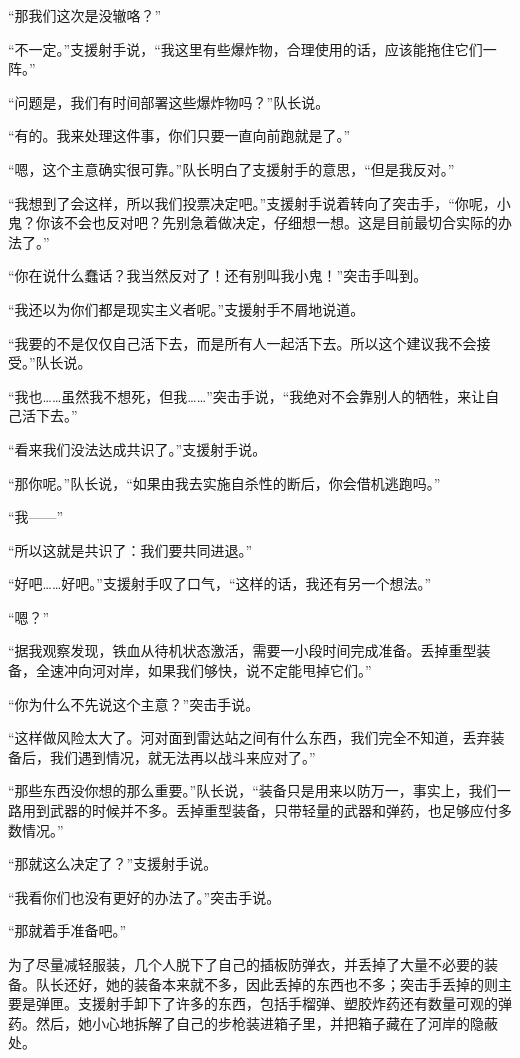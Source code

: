 “那我们这次是没辙咯？”

“不一定。”支援射手说，“我这里有些爆炸物，合理使用的话，应该能拖住它们一阵。”

“问题是，我们有时间部署这些爆炸物吗？”队长说。

“有的。我来处理这件事，你们只要一直向前跑就是了。”

“嗯，这个主意确实很可靠。”队长明白了支援射手的意思，“但是我反对。”

“我想到了会这样，所以我们投票决定吧。”支援射手说着转向了突击手，“你呢，小鬼？你该不会也反对吧？先别急着做决定，仔细想一想。这是目前最切合实际的办法了。”

“你在说什么蠢话？我当然反对了！还有别叫我小鬼！”突击手叫到。

“我还以为你们都是现实主义者呢。”支援射手不屑地说道。

“我要的不是仅仅自己活下去，而是所有人一起活下去。所以这个建议我不会接受。”队长说。

“我也……虽然我不想死，但我……”突击手说，“我绝对不会靠别人的牺牲，来让自己活下去。”

“看来我们没法达成共识了。”支援射手说。

“那你呢。”队长说，“如果由我去实施自杀性的断后，你会借机逃跑吗。”

“我——”

“所以这就是共识了：我们要共同进退。”

“好吧……好吧。”支援射手叹了口气，“这样的话，我还有另一个想法。”

“嗯？”

“据我观察发现，铁血从待机状态激活，需要一小段时间完成准备。丢掉重型装备，全速冲向河对岸，如果我们够快，说不定能甩掉它们。”

“你为什么不先说这个主意？”突击手说。

“这样做风险太大了。河对面到雷达站之间有什么东西，我们完全不知道，丢弃装备后，我们遇到情况，就无法再以战斗来应对了。”

“那些东西没你想的那么重要。”队长说，“装备只是用来以防万一，事实上，我们一路用到武器的时候并不多。丢掉重型装备，只带轻量的武器和弹药，也足够应付多数情况。”

“那就这么决定了？”支援射手说。

“我看你们也没有更好的办法了。”突击手说。

“那就着手准备吧。”

为了尽量减轻服装，几个人脱下了自己的插板防弹衣，并丢掉了大量不必要的装备。队长还好，她的装备本来就不多，因此丢掉的东西也不多；突击手丢掉的则主要是弹匣。支援射手卸下了许多的东西，包括手榴弹、塑胶炸药还有数量可观的弹药。然后，她小心地拆解了自己的步枪装进箱子里，并把箱子藏在了河岸的隐蔽处。

